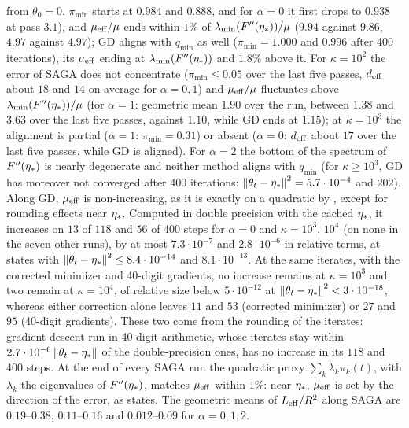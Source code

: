 from $\theta_0=0$, $\pi_{\min}$ starts at $0.984$ and $0.888$, and for $\alpha=0$ it first drops to $0.938$ at pass
$3.1$), and $\mu_{\mathrm{eff}}/\mu$ ends within $1\%$ of $\lambda_{\min}(F''(\eta_\ast))/\mu$ ($9.94$ against $9.86$, $4.97$ against $4.97$);
GD aligns with $q_{\min}$ as well ($\pi_{\min}=1.000$ and $0.996$ after 400 iterations), its $\mu_{\mathrm{eff}}$ ending at
$\lambda_{\min}(F''(\eta_\ast))$ and $1.8\%$ above it. For $\kappa=10^2$ the error of SAGA does not concentrate ($\pi_{\min}\le0.05$
over the last five passes, $d_{\rm eff}$ about $18$ and $14$ on average for $\alpha=0,1$) and $\mu_{\mathrm{eff}}/\mu$ fluctuates
above $\lambda_{\min}(F''(\eta_\ast))/\mu$ (for $\alpha=1$: geometric mean $1.90$ over the run, between $1.38$ and $3.63$ over the
last five passes, against $1.10$, while GD ends at $1.15$); at $\kappa=10^3$ the alignment is partial ($\alpha=1$:
$\pi_{\min}=0.31$) or absent ($\alpha=0$: $d_{\rm eff}$ about $17$ over the last five passes, while GD is aligned). For
$\alpha=2$ the bottom of the spectrum of $F''(\eta_\ast)$ is nearly degenerate and neither method aligns with $q_{\min}$
(for $\kappa\ge10^3$, GD has moreover not converged after 400 iterations: $\left\|\theta_t-\eta_\ast\right\|^2=5.7\cdot10^{-4}$ and
$202$). Along GD, $\mu_{\mathrm{eff}}$ is non-increasing, as it is exactly on a quadratic by , except for
rounding effects near $\eta_\ast$. Computed in double precision with the cached $\eta_\ast$, it increases on $13$ of $118$
and $56$ of $400$ steps for $\alpha=0$ and $\kappa=10^3$, $10^4$ (on none in the seven other runs), by at most
$7.3\cdot10^{-7}$ and $2.8\cdot10^{-6}$ in relative terms, at states with $\left\|\theta_t-\eta_\ast\right\|^2\le8.4\cdot10^{-14}$
and $8.1\cdot10^{-13}$. At the same iterates, with the corrected minimizer and 40-digit gradients, no increase remains at
$\kappa=10^3$ and two remain at $\kappa=10^4$, of relative size below $5\cdot10^{-12}$ at
$\left\|\theta_t-\eta_\ast\right\|^2<3\cdot10^{-18}$, whereas either correction alone leaves $11$ and $53$ (corrected minimizer)
or $27$ and $95$ (40-digit gradients). These two come from the rounding of the iterates: gradient descent run in 40-digit
arithmetic, whose iterates stay within $2.7\cdot10^{-6}\left\|\theta_t-\eta_\ast\right\|$ of the double-precision ones, has no
increase in its $118$ and $400$ steps. At the end of every SAGA run the quadratic proxy
$\sum_k\lambda_k\pi_k(t)$, with $\lambda_k$ the eigenvalues of $F''(\eta_\ast)$, matches $\mu_{\mathrm{eff}}$ within $1\%$: near
$\eta_\ast$, $\mu_{\mathrm{eff}}$ is set by the direction of the error, as  states. The geometric means of
$L_{\mathrm{eff}}/R^2$ along SAGA are $0.19$--$0.38$, $0.11$--$0.16$ and $0.012$--$0.09$ for $\alpha=0,1,2$.

